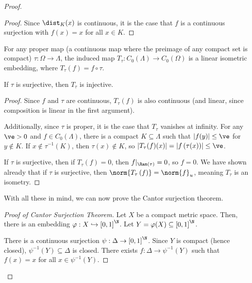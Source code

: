 \documentclass[10pt]{mypackage}
\begin{document}
\begin{proof}
\begin{proof}
    Since $\dist_{K}(x)$ is continuous, it is the case that $f$ is a continuous surjection with $f(x) = x$ for all $x\in K$.
  \end{proof}
  \begin{lemma}
    For any proper map (a continuous map where the preimage of any compact set is compact) $\tau: \Omega\rightarrow \Lambda$, the induced map $T_{\tau}: C_0(\Lambda)\rightarrow C_0(\Omega)$ is a linear isometric embedding, where $T_{\tau}\left(f\right) = f\circ \tau$.\newline

    If $\tau$ is surjective, then $T_{\tau}$ is injective.
  \end{lemma}
  \begin{proof}
    Since $f$ and $\tau$ are continuous, $T_{\tau}\left(f\right)$ is also continuous (and linear, since composition is linear in the first argument).\newline

    Additionally, since $\tau$ is proper, it is the case that $T_{\tau}$ vanishes at infinity. For any $\ve > 0$ and $f\in C_0\left(\Lambda\right)$, there is a compact $K\subseteq \Lambda$ such that $\left\vert f(y) \right\vert \leq \ve$ for $y\notin K$. If $x\notin \tau^{-1}\left(K\right)$, then $\tau(x)\notin K$, so $\left\vert T_{\tau}(f)(x) \right\vert = \left\vert f\left(\tau(x)\right) \right\vert \leq \ve$.\newline

    If $\tau$ is surjective, then if $T_{\tau}\left(f\right) = 0$, then $f|_{\Ran(\tau)} = 0$, so $f = 0$. We have shown already that if $\tau$ is surjective, then $\norm{T_{\tau}\left(f\right)} = \norm{f}_{u}$, meaning $T_{\tau}$ is an isometry.
  \end{proof}
  With all these in mind, we can now prove the Cantor surjection theorem.
  \begin{proof}[Proof of Cantor Surjection Theorem]
    Let $X$ be a compact metric space. Then, there is an embedding $\varphi: X\hookrightarrow \left[0,1\right]^{\N}$. Let $Y = \varphi(X) \subseteq \left[0,1\right]^{\N}$.\newline

    There is a continuous surjection $\psi: \Delta \rightarrow \left[0,1\right]^{\N}$. Since $Y$ is compact (hence closed), $\psi^{-1}\left(Y\right) \subseteq \Delta$ is closed. There exists $f: \Delta \rightarrow \psi^{-1}(Y)$ such that $f(x) = x$ for all $x\in \psi^{-1}(Y)$.\newline


\end{proof}
\end{proof}
\end{document}
